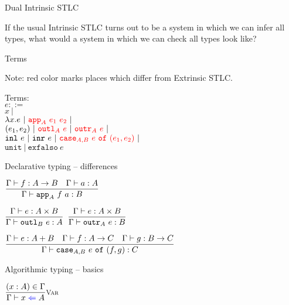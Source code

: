 \documentclass{beamer}
\newcommand{\pipe}{\ |\ }
\newcommand{\Fun}[2]{#1 \to #2}
\newcommand{\Prod}[2]{#1 \times #2}
\newcommand{\Sum}[2]{#1 + #2}
\newcommand{\fun}[2]{\lambda #1. #2}
\newcommand{\pair}[2]{(#1, #2)}
\newcommand{\inl}[1][]{\texttt{inl}\ #1}
\newcommand{\inr}[1][]{\texttt{inr}\ #1}
\newcommand{\unit}{\texttt{unit}}
\newcommand{\exfalso}[1][]{\texttt{exfalso}\ #1}
\newcommand{\fulltyping}[3]{#1 \vdash #2 : #3}
\newcommand{\typing}[2]{\fulltyping{\Gamma}{#1}{#2}}
\newcommand{\infrule}[3][]{\displaystyle \frac{#2}{#3} \textsc{\footnotesize{#1}}}
\newcommand{\sidecond}[1]{#1}
\begin{document}
\begin{frame}{Dual Intrinsic STLC}

If the usual Intrinsic STLC turns out to be a system in which we can infer all types, what would a system in which we can check all types look like?

\end{frame}

\begin{frame}{Terms}

Note: red color marks places which differ from Extrinsic STLC.

\vspace{2em}

Terms: \\
$e ::=$ \\
\qquad $x \pipe$ \\
\qquad $\fun{x}{e} \pipe \termdiff{\iapp{A}{e_1}{e_2}} \pipe$ \\
\qquad $\pair{e_1}{e_2} \pipe \termdiff{\ioutl{A}{e}} \pipe \termdiff{\ioutr{A}{e}} \pipe$ \\
\qquad $\inl[e] \pipe \inr[e] \pipe \termdiff{\icase{A}{B}{e}{e_1}{e_2}} \pipe$ \\
\qquad $\unit \pipe \exfalso{e}$

\end{frame}

\begin{frame}{Declarative typing -- differences}

\begin{center}
  $\infrule{\typing{f}{\Fun{A}{B}} \quad \typing{a}{A}}{\typing{\iapp{A}{f}{a}}{B}}$

  \vspace{2em}

  $\infrule{\typing{e}{\Prod{A}{B}}}{\typing{\ioutl{B}{e}}{A}}$ \quad
  $\infrule{\typing{e}{\Prod{A}{B}}}{\typing{\ioutr{A}{e}}{B}}$ \quad

  \vspace{2em}

  $\infrule{\typing{e}{\Sum{A}{B}} \quad \typing{f}{\Fun{A}{C}} \quad \typing{g}{\Fun{B}{C}}}{\typing{\icase{A}{B}{e}{f}{g}}{C}}$
\end{center}

\end{frame}

\begin{frame}{Algorithmic typing -- basics}

\begin{center}
  $\infrule[Var]{\sidecond{(x : A) \in \Gamma}}{\check{x}{A}}$
\end{center}

\end{frame}
\end{document}
